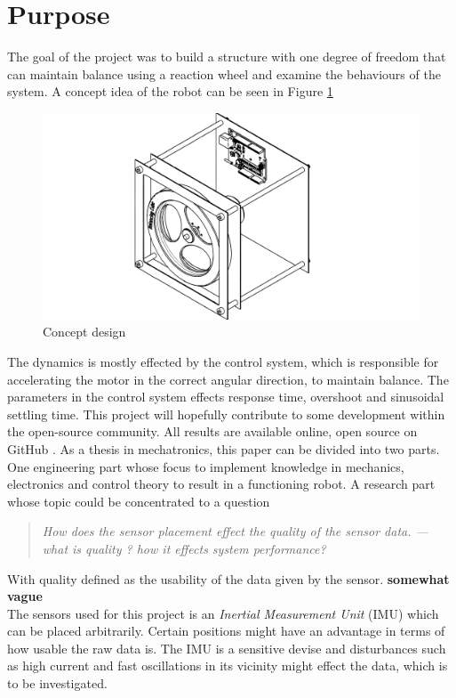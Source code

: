 \documentclass[a4paper,11pt]{kth-mag}
\begin{document}
\section{Purpose}
The goal of the project was to build a structure with one degree of freedom that can maintain balance using a reaction wheel and examine the behaviours of the system. A concept idea of the robot can be seen in Figure \ref{Figure: concept idea}
\begin{figure}[!htb] 
\centering
\includegraphics[width = \textwidth]{concept.pdf}
\caption{Concept design}
\label{Figure: concept idea}
\end{figure}

The dynamics is mostly effected by the control system, which is responsible for accelerating the motor in the  correct angular direction, to maintain balance. The parameters in the control system effects response time, overshoot and sinusoidal settling time.
This project will hopefully contribute to some development within the open-source community.
All results are available online, open source on GitHub \cite{Github}.
As a thesis in mechatronics, this paper can be divided into two parts. One engineering part whose focus to implement knowledge in mechanics, electronics and control theory to result in a functioning robot. A research part whose topic could be concentrated to a question 

\begin{quote}
\textit{
How does the sensor placement effect the quality of the sensor data. --- what is quality ? how it effects system performance?}
\end{quote}
With quality defined as the usability of the data given by the sensor. \textbf{somewhat vague}
\\
The sensors used for this project is an \textit{Inertial Measurement Unit} (IMU) which can be placed arbitrarily. Certain positions might have an advantage in terms of how usable the raw data is. The IMU is a sensitive devise and disturbances such as high current and fast oscillations in its vicinity might effect the data, which is to be investigated. 
\end{document}
